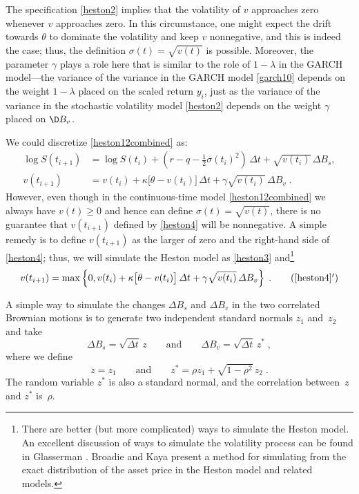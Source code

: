 The specification \eqref{heston2} implies that the volatility of $v$ approaches zero whenever $v$ approaches zero.      In this circumstance, one might expect the drift towards $\theta$ to dominate the volatility and keep $v$ nonnegative, and this is indeed the case; thus, the definition $\sigma(t) = \sqrt{v(t)}$ is possible.  Moreover, the parameter $\gamma$ plays a role here that is similar to the role of $1-\lambda$ in the GARCH model---the variance of the variance in the GARCH model \eqref{garch10} depends on the weight $1-\lambda$ placed on the scaled return $y_i$, just as the variance of the variance in the stochastic volatility model \eqref{heston2} depends on the weight $\gamma$ placed on  $\D B_v$.

We could discretize \eqref{heston12combined} as:
\begin{subequations}
\begin{align}
\log S(t_{i+1}) &= \log S(t_i) + \left(r-q-\frac{1}{2}\sigma(t_i)^2\right)\,\varDelta t + \sqrt{v(t_i)}\,\varDelta B_s,\label{heston3}\\
v(t_{i+1}) &= v(t_i) + \kappa \big[\theta-v(t_i)\big]\,\varDelta t + \gamma \sqrt{v(t_i)}\,\varDelta B_v\;.\label{heston4}
\end{align}
\end{subequations}
However, even though in the continuous-time model \eqref{heston12combined} we always have $v(t) \geq 0$ and hence can define $\sigma(t)=\sqrt{v(t)}$, there is no guarantee that $v(t_{i+1})$ defined by \eqref{heston4} will be nonnegative.  A simple remedy is to define $v(t_{i+1})$ as the larger of zero and the right-hand side of \eqref{heston4}; thus, we will simulate the Heston model as \eqref{heston3} and\footnote{There are better (but more complicated) ways to simulate the Heston model.  An excellent discussion of ways to simulate the volatility process can be found in Glasserman \cite{Glasserman}.  Broadie and Kaya \cite{broadiekaya} present a method for simulating from the exact distribution of the asset price in the Heston model and related models.}
\begin{equation}\label{heston41}
v(t_{i+1}) = \max\left\{0,v(t_i) + \kappa \big[\theta-v(t_i)\big]\,\varDelta t + \gamma \sqrt{v(t_i)}\,\varDelta B_v\right\}\;.\tag{\ref{heston4}$'$}
\end{equation}


A simple way to simulate the changes $\varDelta B_s$ and $\varDelta B_v$ in the two correlated Brownian motions is to generate two independent standard normals $z_1$ and~$z_2$ and take
$$\varDelta B_s = \sqrt{\varDelta t}\,z \qquad \text{and} \qquad \varDelta B_v = \sqrt{\varDelta t}\,z^*\; ,$$
where we define 
$$z = z_1 \qquad \text{and} \qquad z^* = \rho z_1 + \sqrt{1-\rho^2}\,z_2\; .$$
The random variable $z^*$ is also a standard normal, and the correlation between~$z$ and $z^*$ is~$\rho$.  

